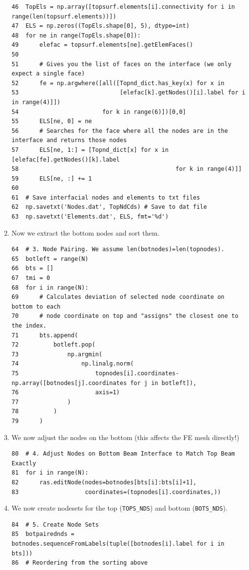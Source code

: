 \documentclass[11pt]{article}
\begin{document}
\begin{enumerate}
\begin{verbatim}
46  TopEls = np.array([topsurf.elements[i].connectivity for i in range(len(topsurf.elements))])
47  ELS = np.zeros((TopEls.shape[0], 5), dtype=int)
48  for ne in range(TopEls.shape[0]):
49      elefac = topsurf.elements[ne].getElemFaces()
50  
51      # Gives you the list of faces on the interface (we only expect a single face)
52      fe = np.argwhere([all([Topnd_dict.has_key(x) for x in 
53                             [elefac[k].getNodes()[i].label for i in range(4)]])
54                        for k in range(6)])[0,0]
55      ELS[ne, 0] = ne
56      # Searches for the face where all the nodes are in the interface and returns those nodes
57      ELS[ne, 1:] = [Topnd_dict[x] for x in [elefac[fe].getNodes()[k].label
58                                             for k in range(4)]]
59      ELS[ne, :] += 1
60  
61  # Save interfacial nodes and elements to txt files
62  np.savetxt('Nodes.dat', TopNdCds) # Save to dat file
63  np.savetxt('Elements.dat', ELS, fmt='%d')
\end{verbatim}
\item Now we extract the bottom nodes and sort them.
\begin{verbatim}
64  # 3. Node Pairing. We assume len(botnodes)=len(topnodes).
65  botleft = range(N)
66  bts = []
67  tmi = 0
68  for i in range(N):
69      # Calculates deviation of selected node coordinate on bottom to each
70      # node coordinate on top and "assigns" the closest one to the index.
71      bts.append(
72          botleft.pop(
73              np.argmin(
74                  np.linalg.norm(
75                      topnodes[i].coordinates-np.array([botnodes[j].coordinates for j in botleft]),
76                      axis=1)
77              )
78          )
79      )
\end{verbatim}
\item We now adjust the nodes on the bottom (this affects the FE mesh directly!)
\begin{verbatim}
80  # 4. Adjust Nodes on Bottom Beam Interface to Match Top Beam Exactly
81  for i in range(N):
82      ras.editNode(nodes=botnodes[bts[i]:bts[i]+1],
83                   coordinates=(topnodes[i].coordinates,))
\end{verbatim}
\item We now create nodesets for the top (\texttt{TOPS\_NDS}) and bottom (\texttt{BOTS\_NDS}).
\begin{verbatim}
84  # 5. Create Node Sets
85  botpairednds = botnodes.sequenceFromLabels(tuple([botnodes[i].label for i in bts]))
86  # Reordering from the sorting above

\end{verbatim}
\end{enumerate}
\end{document}
